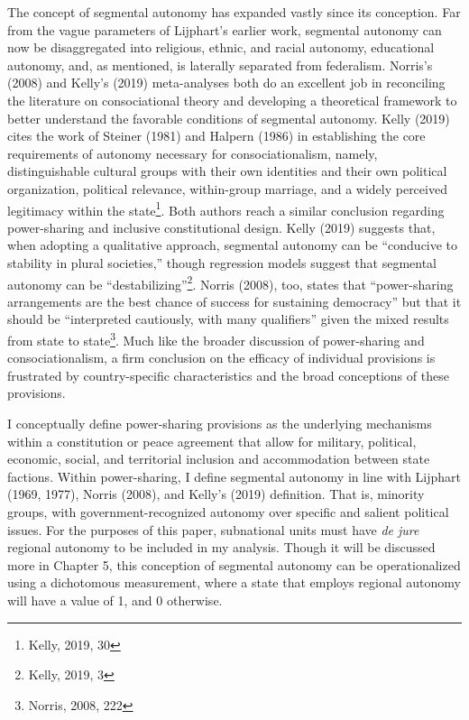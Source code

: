 \documentclass[12pt]{article}
\begin{document}
The concept of segmental autonomy has expanded vastly since its conception. Far from the vague parameters of Lijphart’s earlier work, segmental autonomy can now be disaggregated into religious, ethnic, and racial autonomy, educational autonomy, and, as mentioned, is laterally separated from federalism. Norris’s (2008) and Kelly’s (2019) meta-analyses both do an excellent job in reconciling the literature on consociational theory and developing a theoretical framework to better understand the favorable conditions of segmental autonomy. Kelly (2019) cites the work of Steiner (1981) and Halpern (1986) in establishing the core requirements of autonomy necessary for consociationalism, namely, distinguishable cultural groups with their own identities and their own political organization, political relevance, within-group marriage, and a widely perceived legitimacy within the state\footnote{Kelly, 2019, 30}. Both authors reach a similar conclusion regarding power-sharing and inclusive constitutional design. Kelly (2019) suggests that, when adopting a qualitative approach, segmental autonomy can be “conducive to stability in plural societies,” though regression models suggest that segmental autonomy can be “destabilizing”\footnote{Kelly, 2019, 3}. Norris (2008), too, states that “power-sharing arrangements are the best chance of success for sustaining democracy” but that it should be “interpreted cautiously, with many qualifiers” given the mixed results from state to state\footnote{Norris, 2008, 222}. Much like the broader discussion of power-sharing and consociationalism, a firm conclusion on the efficacy of individual provisions is frustrated by country-specific characteristics and the broad conceptions of these provisions.

I conceptually define power-sharing provisions as the underlying mechanisms within a constitution or peace agreement that allow for military, political, economic, social, and territorial inclusion and accommodation between state factions. Within power-sharing, I define segmental autonomy in line with Lijphart (1969, 1977), Norris (2008), and Kelly’s (2019) definition. That is, minority groups, with government-recognized autonomy over specific and salient political issues. For the purposes of this paper, subnational units must have \textit{de jure} regional autonomy to be included in my analysis. Though it will be discussed more in Chapter 5, this conception of segmental autonomy can be operationalized using a dichotomous measurement, where a state that employs regional autonomy will have a value of 1, and 0 otherwise.
\end{document}
